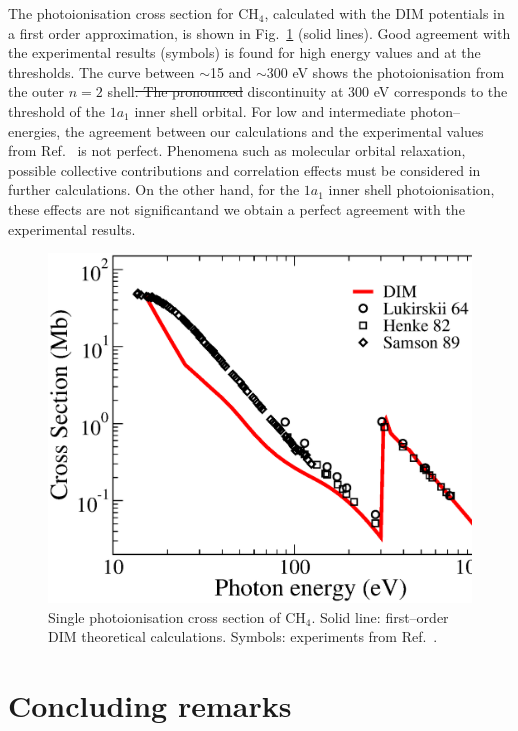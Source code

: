 \documentclass[10pt]{article}
\providecommand{\DIFaddtex}[1]{{\protect\color{blue}\uwave{#1}}} %
\providecommand{\DIFdeltex}[1]{{\protect\color{red}\sout{#1}}}                      %
\providecommand{\DIFaddbegin}{} %
\providecommand{\DIFaddend}{} %
\providecommand{\DIFdelbegin}{} %
\providecommand{\DIFdelend}{} %
\providecommand{\DIFadd}[1]{\texorpdfstring{\DIFaddtex{#1}}{#1}} %
\providecommand{\DIFdel}[1]{\texorpdfstring{\DIFdeltex{#1}}{}} %
\begin{document}
The photoionisation cross section for CH$_4$, calculated with the DIM 
potentials in a first order approximation, is shown in 
Fig.~\ref{fig:photoch4} (solid lines).
Good agreement with the experimental results (symbols) is found for 
high energy values and at the thresholds. The curve between $\sim$15 and
$\sim$300 eV shows the photoionisation from the outer $n=2$ shell\DIFdelbegin \DIFdel{. 
The pronounced }\DIFdelend \DIFaddbegin \DIFadd{, while 
the }\DIFaddend discontinuity at 300 eV corresponds to the threshold of
the $1a_1$ inner shell orbital. For low and intermediate photon--energies,
the agreement between our calculations and the experimental values 
from Ref.~\cite{Lukirskii1964,Henke1982,Samson1989} is not perfect.
Phenomena such as molecular orbital relaxation, possible 
collective contributions and correlation effects must be considered 
in further calculations. On the other hand, for the $1a_1$ inner shell
photoionisation, these effects are not significant\DIFaddbegin \DIFadd{, }\DIFaddend and we obtain a 
perfect agreement with the experimental results.
\begin{figure}[H]
\centering
\includegraphics[height=0.23\textheight]{figures/dimpot/photoch4.eps}
\caption{Single photoionisation cross section of CH$_4$.
Solid line: first--order DIM theoretical calculations. Symbols: experiments
from Ref.~\cite{Lukirskii1964,Henke1982,Samson1989}.}
\label{fig:photoch4}
\end{figure}


\section{Concluding remarks}
\end{document}
